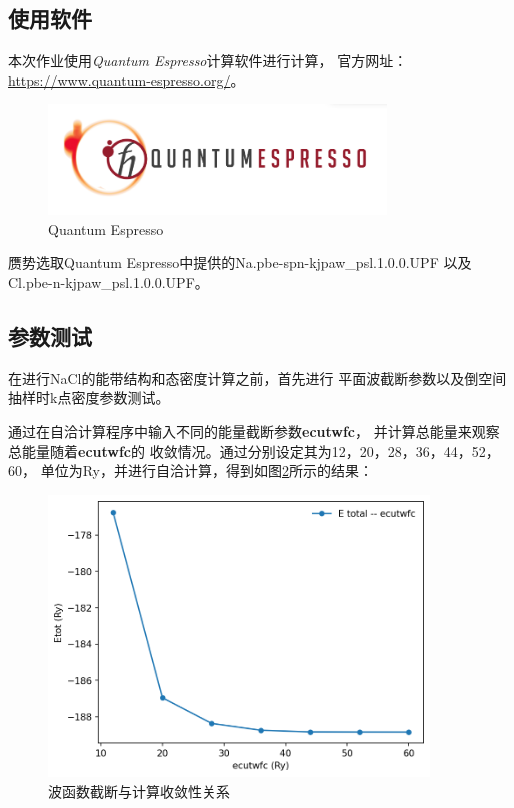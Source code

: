\documentclass[UTF8]{ctexart}
\numberwithin{figure}{section}  %
\numberwithin{table}{section}
\numberwithin{equation}{section}
\begin{document}
    \subsection{使用软件}
        本次作业使用\emph{Quantum Espresso}计算软件进行计算，
    官方网址：\url{https://www.quantum-espresso.org/}。


        \begin{figure}[H]
            \centering
            \includegraphics[width=0.8\textwidth]{Screenshot 2022-11-12 131150.png}
            \caption{Quantum Espresso}
            \label{Fig:2}
        \end{figure}

        赝势选取Quantum Espresso中提供的Na.pbe-spn-kjpaw\_psl.1.0.0.UPF
    以及Cl.pbe-n-kjpaw\_psl.1.0.0.UPF。

    \subsection{参数测试}
        在进行NaCl的能带结构和态密度计算之前，首先进行
    平面波截断参数以及倒空间抽样时k点密度参数测试。\par 
    通过在自洽计算程序中输入不同的能量截断参数\textbf{ecutwfc}，
    并计算总能量来观察总能量随着\textbf{ecutwfc}的
    收敛情况。通过分别设定其为12，20，28，36，44，52，60，
    单位为Ry，并进行自洽计算，得到如图\ref{Fig:3}所示的结果：

    \begin{figure}[H]
        \centering
        \includegraphics[width=0.9\textwidth]{etot_ecutwfc.png}
        \caption{波函数截断与计算收敛性关系}
        \label{Fig:3}
    \end{figure}
\end{document}
